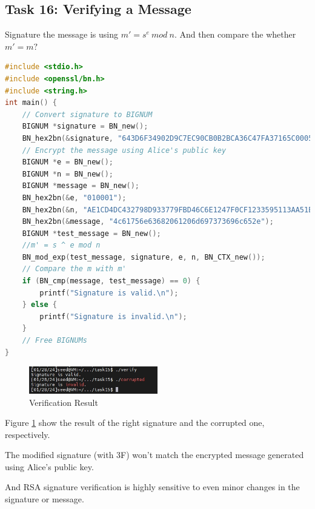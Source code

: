 \documentclass[a4paper]{article}
\begin{document}
\subsection{Task 16: Verifying a Message}
Signature the message is using $m' = s^e\ mod\ n$. And then compare the whether $m' = m?$
\begin{lstlisting}[caption={C Program Code for Verifying},label={lst:task4.16},language=C,breaklines=true]
#include <stdio.h>
#include <openssl/bn.h>
#include <string.h>
int main() {
    // Convert signature to BIGNUM
    BIGNUM *signature = BN_new();
    BN_hex2bn(&signature, "643D6F34902D9C7EC90CB0B2BCA36C47FA37165C0005CAB026C0542CBDB6802F");
    // Encrypt the message using Alice's public key
    BIGNUM *e = BN_new();
    BIGNUM *n = BN_new();
    BIGNUM *message = BN_new();
    BN_hex2bn(&e, "010001");
    BN_hex2bn(&n, "AE1CD4DC432798D933779FBD46C6E1247F0CF1233595113AA51B450F18116115");
    BN_hex2bn(&message, "4c61756e63682061206d697373696c652e");
    BIGNUM *test_message = BN_new();
    //m' = s ^ e mod n
    BN_mod_exp(test_message, signature, e, n, BN_CTX_new());
    // Compare the m with m'
    if (BN_cmp(message, test_message) == 0) {
        printf("Signature is valid.\n");
    } else {
        printf("Signature is invalid.\n");
    }
    // Free BIGNUMs
}
\end{lstlisting} 
\begin{figure}[h]
    \centering
       \includegraphics[width=0.5\textwidth]{figures/task16/messageverify.png}
    \caption{Verification Result}\label{fig:task16}
\end{figure}
Figure \ref{fig:task16} show the result of the right signature and  the corrupted one, respectively. 

The modified signature (with 3F) won't match the encrypted message generated using Alice's public key. 

And RSA signature verification is highly sensitive to even minor changes in the signature or message.
\end{document}
